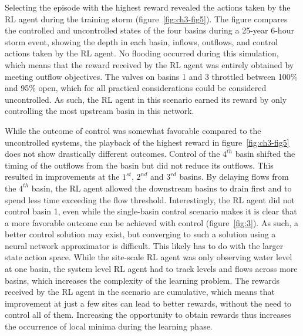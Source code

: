 Selecting the episode with the highest reward revealed the actions taken by the RL agent during the training storm (figure~\ref{fig:ch3-fig5}).
The figure compares the controlled and uncontrolled states of the four basins during a 25-year 6-hour storm event, showing the depth in each basin, inflows, outflows, and control actions taken by the RL agent.
No flooding occurred during this simulation, which means that the reward received by the RL agent was entirely obtained by meeting outflow objectives.
The valves on basins 1 and 3 throttled between 100\% and 95\% open, which for all practical considerations could be considered uncontrolled.
As such, the RL agent in this scenario earned its reward by only controlling the most upstream basin in this network.

While the outcome of control was somewhat favorable compared to the uncontrolled systems, the playback of the highest reward in figure~\ref{fig:ch3-fig5} does not show drastically different outcomes.
Control of the $4^{th}$ basin shifted the timing of the outflows from the basin but did not reduce its outflows.
This resulted in improvements at the $1^{st}$, $2^{nd}$ and $3^{rd}$ basins.
By delaying flows from the $4^{th}$ basin, the RL agent allowed the downstream basins to drain first and to spend less time exceeding the flow threshold.
Interestingly, the RL agent did not control basin 1, even while the single-basin control scenario makes it is clear that a more favorable outcome can be achieved with control (figure~\ref{fig:3}).
As such, a better control solution may exist, but converging to such a solution using a neural network approximator is difficult.
This likely has to do with the larger state action space.
While the site-scale RL agent was only observing water level at one basin, the system level RL agent had to track levels and flows across more basins, which increases the complexity of the learning problem.
The rewards received by the RL agent in the scenario are cumulative, which means that improvement at just a few sites can lead to better rewards, without the need to control all of them.
Increasing the opportunity to obtain rewards thus increases the occurrence of local minima during the learning phase.

